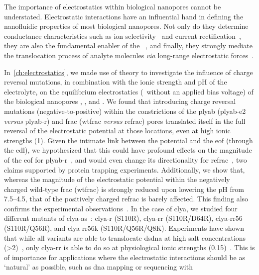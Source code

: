 The importance of electrostatics within biological nanopores cannot be understated. Electrostatic interactions
have an influential hand in defining the nanofluidic properties of most biological nanopores. Not only do they
determine conductance characteristics such as ion selectivity~\cite{Ramirez-2007} and current
rectification~\cite{Wang-2014}, they are also the fundamental enabler of the
~\cite{Bocquet-2010}, and finally, they strongly mediate the translocation process of analyte
molecules \textit{via} long-range electrostatic forces~\cite{Maglia-2008,Asandei-2015b,Fahie-2015b}.

In~\cref{ch:electrostatics}, we made use of  theory to investigate the influence of charge
reversal mutations, in combination with the ionic strength and pH of the electrolyte, on the equilibrium
electrostatics (\ie~without an applied bias voltage) of the biological nanopores ,
, and . We found that introducing charge reversal mutations
(negative-to-positive) within the constrictions of the \gls{plyab} (\gls{plyab-e2} \textit{versus}
\gls{plyab-r}) and \gls{frac} (\gls{wtfrac} \textit{versus} \gls{refrac}) pores translated itself in the full
reversal of the electrostatic potential at those locations, even at high ionic strengths (\SI{1}{\Molar}).
Given the intimate link between the potential and the \gls{eof} (through the \gls{edl}), we hypothesized that
this could have profound effects on the magnitude of the \gls{eof} for \gls{plyab-r}~\cite{Huang-2020}, and
would even change its directionality for \gls{refrac}~\cite{Huang-2017}, two claims supported by protein
trapping experiments. Additionally, we show that, whereas the magnitude of the electrostatic potential within
the negatively charged wild-type \gls{frac} (\gls{wtfrac}) is strongly reduced upon lowering the pH from
\numrange{7.5}{4.5}, that of the positively charged \gls{refrac} is barely affected. This finding also
confirms the experimental observations~\cite{Huang-2017}. In the case of \gls{clya}, we studied four different
mutants of \gls{clya-as}~\cite{Soskine-2013}: \gls{clya-r} (S110R), \gls{clya-rr} (S110R/D64R),
\gls{clya-rr56} (S110R/Q56R), and \gls{clya-rr56k} (S110R/Q56R/Q8K). Experiments have shown that while all
variants are able to translocate \gls{dsdna} at high salt concentrations
(\SI{>2}{\Molar})~\cite{Franceschini-2013}, only \gls{clya-rr} is able to do so at physiological ionic
strengths (\SI{0.15}{\Molar})~\cite{Franceschini-2016}. This is of importance for applications where the
electrostatic interactions should be as `natural' as possible, such as \gls{dna} mapping or sequencing with
